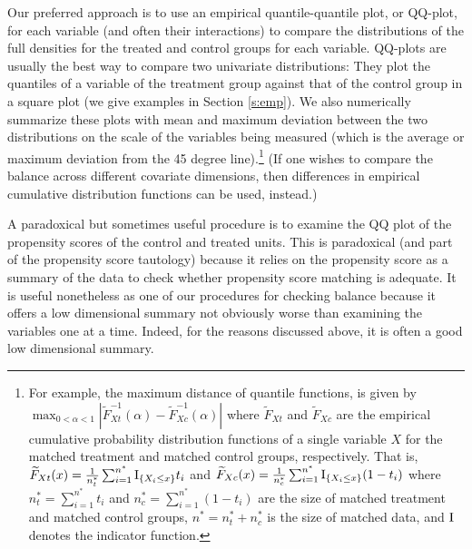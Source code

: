 \documentclass[11pt,titlepage]{article}
\begin{document}
Our preferred approach is to use an empirical quantile-quantile plot,
or QQ-plot, for each variable (and often their interactions) to
compare the distributions of the full densities for the treated and
control groups for each variable.  QQ-plots are usually the best way
to compare two univariate distributions: They plot the quantiles of a
variable of the treatment group against that of the control group in a
square plot (we give examples in Section \ref{s:emp}).  We also
numerically summarize these plots with mean and maximum deviation
between the two distributions on the scale of the variables being
measured (which is the average or maximum deviation from the 45 degree
line).\footnote{For example, the maximum distance of quantile
  functions, is given by $\max_{0 < \alpha < 1}
  |\widetilde{F}_{Xt}^{-1}(\alpha)-\widetilde{F}^{-1}_{Xc}(\alpha)|$
  where $\widetilde{F}_{Xt}$ and $\widetilde{F}_{Xc}$ are the
  empirical cumulative probability distribution functions of a single
  variable $X$ for the matched treatment and matched control groups,
  respectively. That is, $\widetilde{F}_{Xt}(x)=\frac{1}{n^*_t}
  \sum_{i=1}^{n^*} {\rm I}_{\{X_i \le x\}} t_i$ and
  $\widetilde{F}_{Xc}(x)=\frac{1}{n^*_c} \sum_{i=1}^{n^*} {\rm
    I}_{\{X_i \le x\}} (1-t_i)$ where $n^*_t=\sum_{i=1}^{n^*} t_i$ and
  $n^*_c=\sum_{i=1}^{n^*} (1-t_i)$ are the size of matched treatment
  and matched control groups, $n^*=n^*_t + n^*_c$ is the size of
  matched data, and ${\rm I}$ denotes the indicator function.} (If one
wishes to compare the balance across different covariate dimensions,
then differences in empirical cumulative distribution functions can be
used, instead.)

A paradoxical but sometimes useful procedure is to examine the QQ plot
of the propensity scores of the control and treated units.  This is
paradoxical (and part of the propensity score tautology) because it
relies on the propensity score as a summary of the data to check
whether propensity score matching is adequate.  It is useful
nonetheless as one of our procedures for checking balance because it
offers a low dimensional summary not obviously worse than 
examining the variables one at a time.  Indeed, for the reasons discussed
above, it is often a good low dimensional summary.
\end{document}
